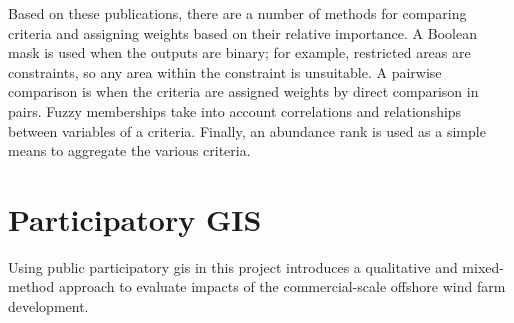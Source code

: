Based on these publications, there are a number of methods for comparing criteria and assigning weights based on their relative importance. A Boolean mask is used when the outputs are binary; for example, restricted areas are constraints, so any area within the constraint is unsuitable. A pairwise comparison is when the criteria are assigned weights by direct comparison in pairs. Fuzzy memberships take into account correlations and relationships between variables of a criteria. Finally, an abundance rank is used as a simple means to aggregate the various criteria.

\section{Participatory GIS}

Using public participatory \gls{gis} in this project introduces a qualitative and mixed-method approach to evaluate impacts of the commercial-scale offshore wind farm development.
